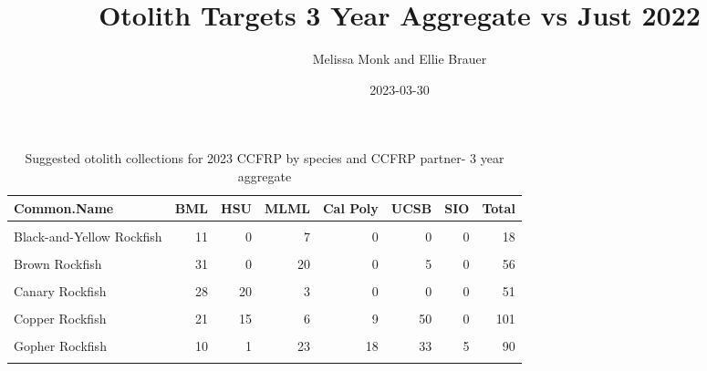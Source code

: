 \documentclass[
]{article}
\title{Otolith Targets 3 Year Aggregate vs Just 2022}
\author{Melissa Monk and Ellie Brauer}
\date{2023-03-30}
\begin{document}
\maketitle

\begin{table}

\caption{\label{tab:collections}Suggested otolith collections for 2023 CCFRP by species and CCFRP partner- 3 year aggregate}
\centering
\begin{tabular}[t]{lrrrrrrr}
\toprule
Common.Name & BML & HSU & MLML & Cal Poly & UCSB & SIO & Total\\
\midrule
\cellcolor{gray!6}{Black Rockfish} & \cellcolor{gray!6}{10} & \cellcolor{gray!6}{11} & \cellcolor{gray!6}{30} & \cellcolor{gray!6}{0} & \cellcolor{gray!6}{0} & \cellcolor{gray!6}{0} & \cellcolor{gray!6}{51}\\
Black-and-Yellow Rockfish & 11 & 0 & 7 & 0 & 0 & 0 & 18\\
\cellcolor{gray!6}{Blue Rockfish} & \cellcolor{gray!6}{10} & \cellcolor{gray!6}{3} & \cellcolor{gray!6}{23} & \cellcolor{gray!6}{15} & \cellcolor{gray!6}{50} & \cellcolor{gray!6}{0} & \cellcolor{gray!6}{101}\\
Brown Rockfish & 31 & 0 & 20 & 0 & 5 & 0 & 56\\
\cellcolor{gray!6}{Calico Rockfish} & \cellcolor{gray!6}{0} & \cellcolor{gray!6}{0} & \cellcolor{gray!6}{0} & \cellcolor{gray!6}{4} & \cellcolor{gray!6}{0} & \cellcolor{gray!6}{16} & \cellcolor{gray!6}{20}\\
\addlinespace
Canary Rockfish & 28 & 20 & 3 & 0 & 0 & 0 & 51\\
\cellcolor{gray!6}{China Rockfish} & \cellcolor{gray!6}{19} & \cellcolor{gray!6}{9} & \cellcolor{gray!6}{23} & \cellcolor{gray!6}{0} & \cellcolor{gray!6}{0} & \cellcolor{gray!6}{0} & \cellcolor{gray!6}{51}\\
Copper Rockfish & 21 & 15 & 6 & 9 & 50 & 0 & 101\\
\cellcolor{gray!6}{Deacon Rockfish} & \cellcolor{gray!6}{38} & \cellcolor{gray!6}{13} & \cellcolor{gray!6}{1} & \cellcolor{gray!6}{0} & \cellcolor{gray!6}{0} & \cellcolor{gray!6}{0} & \cellcolor{gray!6}{52}\\
Gopher Rockfish & 10 & 1 & 23 & 18 & 33 & 5 & 90\\
\addlinespace
\cellcolor{gray!6}{Kelp Rockfish} & \cellcolor{gray!6}{0} & \cellcolor{gray!6}{0} & \cellcolor{gray!6}{11} & \cellcolor{gray!6}{17} & \cellcolor{gray!6}{7} & \cellcolor{gray!6}{5} & \cellcolor{gray!6}{40}\\

\end{tabular}
\end{table}
\end{document}
